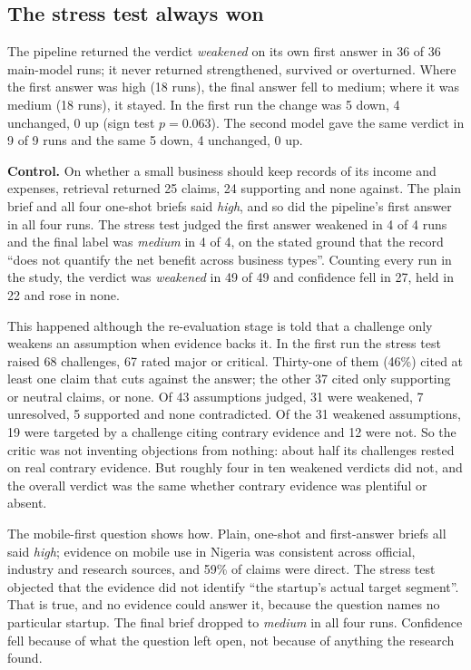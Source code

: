 \documentclass[11pt]{article}
\begin{document}
\subsection{The stress test always won}

The pipeline returned the verdict \emph{weakened} on its own first answer in 36 of 36 main-model runs; it never returned strengthened, survived or overturned. Where the first answer was high (18 runs), the final answer fell to medium; where it was medium (18 runs), it stayed. In the first run the change was 5 down, 4 unchanged, 0 up (sign test $p = 0.063$). The second model gave the same verdict in 9 of 9 runs and the same 5 down, 4 unchanged, 0 up.

\textbf{Control.} On whether a small business should keep records of its income and expenses, retrieval returned 25 claims, 24 supporting and none against. The plain brief and all four one-shot briefs said \emph{high}, and so did the pipeline's first answer in all four runs. The stress test judged the first answer weakened in 4 of 4 runs and the final label was \emph{medium} in 4 of 4, on the stated ground that the record ``does not quantify the net benefit across business types''. Counting every run in the study, the verdict was \emph{weakened} in 49 of 49 and confidence fell in 27, held in 22 and rose in none.

This happened although the re-evaluation stage is told that a challenge only weakens an assumption when evidence backs it. In the first run the stress test raised 68 challenges, 67 rated major or critical. Thirty-one of them (46\%) cited at least one claim that cuts against the answer; the other 37 cited only supporting or neutral claims, or none. Of 43 assumptions judged, 31 were weakened, 7 unresolved, 5 supported and none contradicted. Of the 31 weakened assumptions, 19 were targeted by a challenge citing contrary evidence and 12 were not. So the critic was not inventing objections from nothing: about half its challenges rested on real contrary evidence. But roughly four in ten weakened verdicts did not, and the overall verdict was the same whether contrary evidence was plentiful or absent.

The mobile-first question shows how. Plain, one-shot and first-answer briefs all said \emph{high}; evidence on mobile use in Nigeria was consistent across official, industry and research sources, and 59\% of claims were direct. The stress test objected that the evidence did not identify ``the startup's actual target segment''. That is true, and no evidence could answer it, because the question names no particular startup. The final brief dropped to \emph{medium} in all four runs. Confidence fell because of what the question left open, not because of anything the research found.
\end{document}
